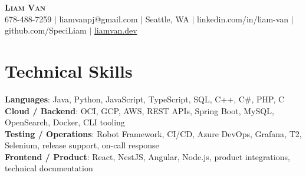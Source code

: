 \documentclass[letterpaper,11pt]{article}
\begin{document}

%
\begin{center}
    \textbf{\Huge \scshape Liam Van} \\ \vspace{1pt}
    \small 678-488-7259 $|$ \small {liamvanpj@gmail.com} $|$ Seattle, WA
 {{$|$ linkedin.com/in/liam-van} {$|$ github.com/SpeciLiam} {$|$ \href{https://liamvan.dev}{liamvan.dev}}}

\end{center}

\section{Technical Skills}
 \begin{itemize}[leftmargin=0.15in, label={}]
    \small{\item{
     \textbf{Languages}{: Java, Python, JavaScript, TypeScript, SQL, C++, C\#, PHP, C} \\
     \textbf{Cloud / Backend}{: OCI, GCP, AWS, REST APIs, Spring Boot, MySQL, OpenSearch, Docker, CLI tooling} \\
     \textbf{Testing / Operations}{: Robot Framework, CI/CD, Azure DevOps, Grafana, T2, Selenium, release support, on-call response} \\
     \textbf{Frontend / Product}{: React, NestJS, Angular, Node.js, product integrations, technical documentation} \\
    }}
 \end{itemize}
%

\end{document}
